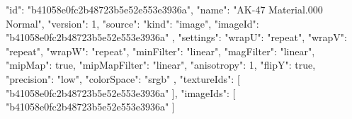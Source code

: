 {
  "id": "b41058e0fc2b48723b5e52e553e3936a",
  "name": "AK-47 Material.000 Normal",
  "version": 1,
  "source": {
    "kind": "image",
    "imageId": "b41058e0fc2b48723b5e52e553e3936a"
  },
  "settings": {
    "wrapU": "repeat",
    "wrapV": "repeat",
    "wrapW": "repeat",
    "minFilter": "linear",
    "magFilter": "linear",
    "mipMap": true,
    "mipMapFilter": "linear",
    "anisotropy": 1,
    "flipY": true,
    "precision": "low",
    "colorSpace": "srgb"
  },
  "textureIds": [
    "b41058e0fc2b48723b5e52e553e3936a"
  ],
  "imageIds": [
    "b41058e0fc2b48723b5e52e553e3936a"
  ]
}
